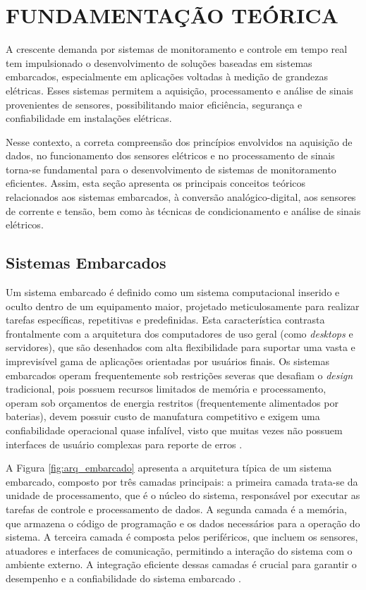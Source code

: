 \chapter{FUNDAMENTAÇÃO TEÓRICA}

A crescente demanda por sistemas de monitoramento e controle em tempo real tem impulsionado o desenvolvimento de soluções baseadas em sistemas embarcados, especialmente em aplicações voltadas à medição de grandezas elétricas. Esses sistemas permitem a aquisição, processamento e análise de sinais provenientes de sensores, possibilitando maior eficiência, segurança e confiabilidade em instalações elétricas.

Nesse contexto, a correta compreensão dos princípios envolvidos na aquisição de dados, no funcionamento dos sensores elétricos e no processamento de sinais torna-se fundamental para o desenvolvimento de sistemas de monitoramento eficientes. Assim, esta seção apresenta os principais conceitos teóricos relacionados aos sistemas embarcados, à conversão analógico-digital, aos sensores de corrente e tensão, bem como às técnicas de condicionamento e análise de sinais elétricos.

\section{Sistemas Embarcados}
Um sistema embarcado é definido como um sistema computacional inserido e oculto dentro de um equipamento maior, projetado meticulosamente para realizar tarefas específicas, repetitivas e predefinidas. Esta característica contrasta frontalmente com a arquitetura dos computadores de uso geral (como \textit{desktops} e servidores), que são desenhados com alta flexibilidade para suportar uma vasta e imprevisível gama de aplicações orientadas por usuários finais. Os sistemas embarcados operam frequentemente sob restrições severas que desafiam o \textit{design} tradicional, pois possuem recursos limitados de memória e processamento, operam sob orçamentos de energia restritos (frequentemente alimentados por baterias), devem possuir custo de manufatura competitivo e exigem uma confiabilidade operacional quase infalível, visto que muitas vezes não possuem interfaces de usuário complexas para reporte de erros \cite{KLS2018, Immes2024}.

A Figura \ref{fig:arq_embarcado} apresenta a arquitetura típica de um sistema embarcado, composto por três camadas principais: a primeira camada trata-se da unidade de processamento, que é o núcleo do sistema, responsável por executar as tarefas de controle e processamento de dados. A segunda camada é a memória, que armazena o código de programação e os dados necessários para a operação do sistema. A terceira camada é composta pelos periféricos, que incluem os sensores, atuadores e interfaces de comunicação, permitindo a interação do sistema com o ambiente externo. A integração eficiente dessas camadas é crucial para garantir o desempenho e a confiabilidade do sistema embarcado \cite{KLS2018}.

